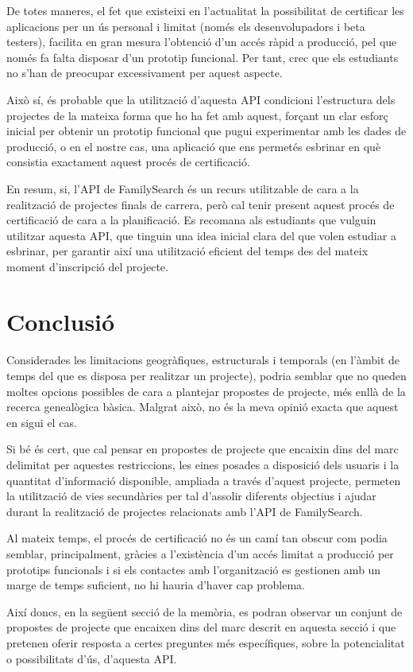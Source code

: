     De totes maneres, el fet que existeixi en l'actualitat la possibilitat de certificar les aplicacions per un ús personal i limitat (només els desenvolupadors i beta testers), facilita en gran mesura l'obtenció d'un accés ràpid a producció, pel que només fa falta disposar d'un prototip funcional. Per tant, crec que els estudiants no s'han de preocupar excessivament per aquest aspecte.

    Això sí, és probable que la utilització d'aquesta API condicioni l'estructura dels projectes de la mateixa forma que ho ha fet amb aquest, forçant un clar esforç inicial per obtenir un prototip funcional que pugui experimentar amb les dades de producció, o en el nostre cas, una aplicació que ens permetés esbrinar en què consistia exactament aquest procés de certificació.

    En resum, si, l'API de FamilySearch és un recurs utilitzable de cara a la realització de projectes finals de carrera, però cal tenir present aquest procés de certificació de cara a la planificació. Es recomana als estudiants que vulguin utilitzar aquesta API, que tinguin una idea inicial clara del que volen estudiar a esbrinar, per garantir així una utilització eficient del temps des del mateix moment d'inscripció del projecte.


\section{Conclusió}

    \paragraph{}
    Considerades les limitacions geogràfiques, estructurals i temporals (en l'àmbit de temps del que es disposa per realitzar un projecte), podria semblar que no queden moltes opcions possibles de cara a plantejar propostes de projecte, més enllà de la recerca genealògica bàsica. Malgrat això, no és la meva opinió exacta que aquest en sigui el cas.

    Si bé és cert, que cal pensar en propostes de projecte que encaixin dins del marc delimitat per aquestes restriccions, les eines posades a disposició dels usuaris i la quantitat d'informació disponible, ampliada a través d'aquest projecte, permeten la utilització de vies secundàries per tal d'assolir diferents objectius i ajudar durant la realització de projectes relacionats amb l'API de FamilySearch.

    Al mateix temps, el procés de certificació no és un camí tan obscur com podia semblar, principalment, gràcies a l'existència d'un accés limitat a producció per prototips funcionals i si els contactes amb l'organització es gestionen amb un marge de temps suficient, no hi hauria d'haver cap problema.

    Així doncs, en la següent secció de la memòria, es podran observar un conjunt de propostes de projecte que encaixen dins del marc descrit en aquesta secció i que pretenen oferir resposta a certes preguntes més específiques, sobre la potencialitat o possibilitats d'ús, d'aquesta API.
